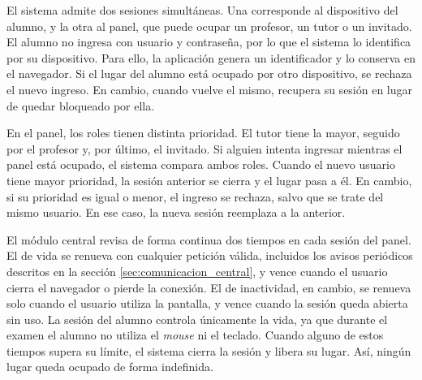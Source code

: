 El sistema admite dos sesiones simultáneas. Una corresponde al dispositivo del alumno, y la otra al panel, que puede ocupar un profesor, un tutor o un invitado. El alumno no ingresa con usuario y contraseña, por lo que el sistema lo identifica por su dispositivo. Para ello, la aplicación genera un identificador y lo conserva en el navegador. Si el lugar del alumno está ocupado por otro dispositivo, se rechaza el nuevo ingreso. En cambio, cuando vuelve el mismo, recupera su sesión en lugar de quedar bloqueado por ella.


En el panel, los roles tienen distinta prioridad. El tutor tiene la mayor, seguido por el profesor y, por último, el invitado. Si alguien intenta ingresar mientras el panel está ocupado, el sistema compara ambos roles. Cuando el nuevo usuario tiene mayor prioridad, la sesión anterior se cierra y el lugar pasa a él. En cambio, si su prioridad es igual o menor, el ingreso se rechaza, salvo que se trate del mismo usuario. En ese caso, la nueva sesión reemplaza a la anterior.



El módulo central revisa de forma continua dos tiempos en cada sesión del panel. El de vida se renueva con cualquier petición válida, incluidos los avisos periódicos descritos en la sección \ref{sec:comunicacion_central}, y vence cuando el usuario cierra el navegador o pierde la conexión. El de inactividad, en cambio, se renueva solo cuando el usuario utiliza la pantalla, y vence cuando la sesión queda abierta sin uso. La sesión del alumno controla únicamente la vida, ya que durante el examen el alumno no utiliza el \emph{mouse} ni el teclado. Cuando alguno de estos tiempos supera su límite, el sistema cierra la sesión y libera su lugar. Así, ningún lugar queda ocupado de forma indefinida.

